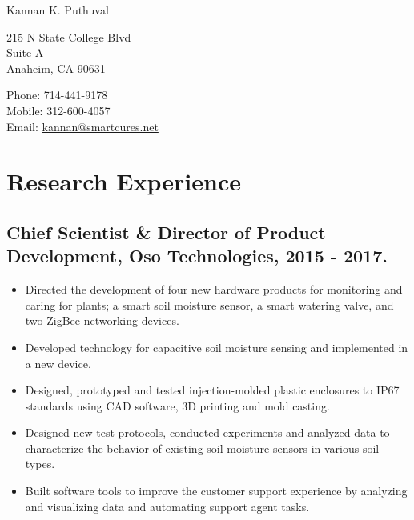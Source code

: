 \documentclass[letterpaper]{article}
\def\name{Kannan K. Puthuval}
\begin{document}
{\huge \name}


\vspace{0.25in}

\begin{minipage}{0.45\linewidth}
  215 N State College Blvd \\
  Suite A \\
  Anaheim, CA 90631 \\
\end{minipage}
\begin{minipage}{0.45\linewidth}
  Phone: 714-441-9178 \\
  Mobile: 312-600-4057 \\
  Email: \href{mailto:kannan@smartcures.net}{kannan@smartcures.net} \\
\end{minipage}

\section*{Research Experience}

  \subsection*{Chief Scientist \& Director of Product Development, Oso Technologies, 2015 - 2017.}

    \begin{itemize}

      \item Directed the development of four new hardware products for monitoring and caring for plants; a smart soil moisture sensor, a smart watering valve, and two ZigBee networking devices.
      \item Developed technology for capacitive soil moisture sensing and implemented in a new device.
      \item Designed, prototyped and tested injection-molded plastic enclosures to IP67 standards using CAD software, 3D printing and mold casting.
      \item Designed new test protocols, conducted experiments and analyzed data to characterize the behavior of existing soil moisture sensors in various soil types.
      \item Built software tools to improve the customer support experience by analyzing and visualizing data and automating support agent tasks.

    \end{itemize}
\end{document}
